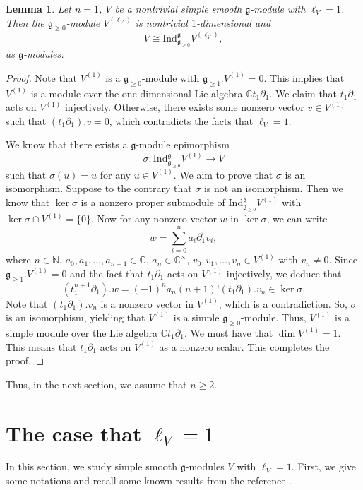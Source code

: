 \documentclass[12pt, a4paper]{amsart}
\newcommand{\fg}{\mathfrak g}
\newcommand{\C}{\mathbb{C}}
\newcommand{\N}{\mathbb N}
\theoremstyle{Theorem}
\theoremstyle{Theorem}
\newtheorem{lemma}[thm]{Lemma}
\numberwithin{equation}{section}
\begin{document}
\begin{lemma}\label{n=1}
	Let $n=1$, $V$ be a nontrivial simple smooth  $\mathfrak{g}$-module with $\ell_V=1$.
	Then the $\mathfrak{g}_{\geq0}$-module $V^{(\ell_V)}$ is nontrivial $1$-dimensional  and
	\[V\cong\mathrm{Ind}_{\mathfrak{g}_{\geq0}}^{\mathfrak{g}}V^{(\ell_V)},\]
	as $\mathfrak{g}$-modules.
\end{lemma}

\begin{proof}
	Note that $V^{(1)}$ is a $\fg_{\geq0}$-module with $\fg_{\geq1}.V^{(1)}=0$. This implies that
	$V^{(1)}$ is a module over the one dimensional Lie algebra $\C t_{1}\partial_{1}$. We claim that $t_{1}\partial_{1}$ acts on $V^{(1)}$ injectively. Otherwise, there exists some nonzero vector $v\in V^{(1)}$ such that $(t_{1}\partial_{1}).v=0$, which contradicts the facts that $\ell_{V}=1$. 
	
	We know that  there exists a $\fg$-module epimorphism
	\[\sigma:\mathrm{Ind}_{\fg_{\geq0}}^{\fg}V^{(1)}\rightarrow V\] such that $\sigma(u)=u$ for any $u\in V^{(1)}$. We aim to prove that $\sigma$ is an isomorphism. Suppose to the contrary that $\sigma$ is not an isomorphism.  Then we know that $\ker\sigma$ is a nonzero proper submodule of $\mathrm{Ind}_{\fg_{\geq0}}^{\fg}V^{(1)}$ with $\ker\sigma\cap V^{(1)}=\{0\}$. Now for any nonzero vector $w$ in $\ker\sigma$, we can  write 
	\[w=\sum_{i=0}^{n}a_{i}\partial_{1}^{i}v_{i},\]
	where $n\in\N$, $a_{0},a_{1},\dots,a_{n-1}\in\C$, $a_{n}\in\C^{\times}$, $v_{0},v_{1},\dots,v_{n}\in V^{(1)}$ with $v_{n}\ne0$. Since $\fg_{\geq1}.V^{(1)}=0$ and the fact that $t_{1}\partial_{1}$ acts on $V^{(1)}$ injectively, we deduce  that 
	\[(t_{1}^{n+1}\partial_{1}).w=(-1)^{n}a_{n}(n+1)!(t_{1}\partial_{1}).v_{n}\in\ker\sigma.\]
	Note that $(t_{1}\partial_{1}).v_{n}$ is a nonzero vector in $V^{(1)}$, which is a  contradiction. So,  $\sigma$ is an isomorphism, yielding  that $V^{(1)}$ is a simple $\fg_{\geq0}$-module. Thus, $V^{(1)}$ is a simple module over the Lie algebra $\C t_{1}\partial_{1}$. We must have that $\dim V^{(1)}=1$. This means that $t_{1}\partial_{1}$ acts on $V^{(1)}$ as a nonzero scalar. This completes the proof. 
\end{proof}

 
Thus, in the next section, we assume that $n\geq2$.
 



\section{The case that $\ell_{V}=1$}
In this section, we study simple smooth $\fg$-modules $V$  with  $\ell_{V}=1$. First, we give some notations and recall some known
results from the reference  \cite{LLZ}.
\end{document}
